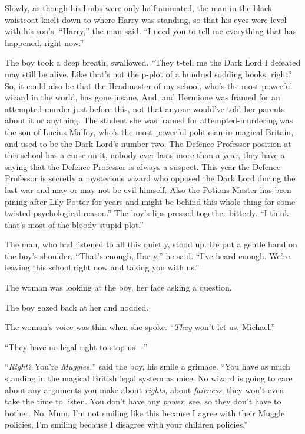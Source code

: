 Slowly, as though his limbs were only half-animated, the man in the black waistcoat knelt down to where Harry was standing, so that his eyes were level with his son’s. “Harry,” the man said. “I need you to tell me everything that has happened, right now.”

The boy took a deep breath, swallowed. “They t-tell me the Dark Lord I defeated may still be alive. Like that’s not the p-plot of a hundred sodding books, right? So, it could also be that the Headmaster of my school, who’s the most powerful wizard in the world, has gone insane. And, and Hermione was framed for an attempted murder just before this, not that anyone would’ve told her parents about it or anything. The student she was framed for attempted-murdering was the son of Lucius Malfoy, who’s the most powerful politician in magical Britain, and used to be the Dark Lord’s number two. The Defence Professor position at this school has a curse on it, nobody ever lasts more than a year, they have a saying that the Defence Professor is always a suspect. This year the Defence Professor is secretly a mysterious wizard who opposed the Dark Lord during the last war and may or may not be evil himself. Also the Potions Master has been pining after Lily Potter for years and might be behind this whole thing for some twisted psychological reason.” The boy’s lips pressed together bitterly. “I think that’s most of the bloody stupid plot.”

The man, who had listened to all this quietly, stood up. He put a gentle hand on the boy’s shoulder. “That’s enough, Harry,” he said. “I’ve heard enough. We’re leaving this school right now and taking you with us.”

The woman was looking at the boy, her face asking a question.

The boy gazed back at her and nodded.

The woman’s voice was thin when she spoke. “\emph{They} won’t let us, Michael.”

“They have no legal right to stop us—”

“\emph{Right?} You’re \emph{Muggles,}” said the boy, his smile a grimace. “You have as much standing in the magical British legal system as mice. No wizard is going to care about any arguments you make about \emph{rights,} about \emph{fairness}, they won’t even take the time to listen. You don’t have any \emph{power,} see, so they don’t have to bother. No, Mum, I’m not smiling like this because I agree with their Muggle policies, I’m smiling because I disagree with your children policies.”

